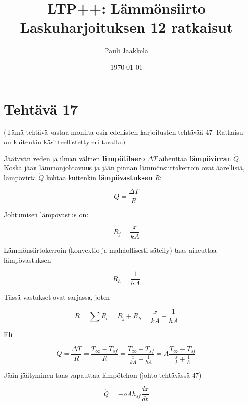\documentclass[12pt,a4paper,finnish]{article}
\title{LTP++: Lämmönsiirto\\Laskuharjoituksen 12 ratkaisut}
\date{\today}
\author{Pauli Jaakkola}
\begin{document}
\maketitle
\tableofcontents
\newpage

\section{Tehtävä 17}

(Tämä tehtävä vastaa monilta osin edellisten harjoitusten tehtävää 47. Ratkaisu on 
kuitenkin käsitteellistetty eri tavalla.)

Jäätyvän veden ja ilman välinen \textbf{lämpötilaero} $\Delta T$ aiheuttaa \textbf{lämpövirran} 
$\dot{Q}$. Koska jään lämmönjohtavuus ja jään pinnan lämmönsiirtokerroin ovat äärellisiä, 
lämpövirta $\dot{Q}$ kohtaa kuitenkin \textbf{lämpövastuksen} $R$:

\begin{equation}
 \dot{Q} = \frac{\Delta T}{R}
\end{equation}

Johtumisen lämpövastus on:

\begin{equation}
 R_j = \frac{x}{kA}
\end{equation}

Lämmönsiirtokerroin (konvektio ja mahdollisesti säteily) taas aiheuttaa lämpövastuksen

\begin{equation}
 R_h = \frac{1}{hA}
\end{equation}

Tässä vastukset ovat sarjassa, joten

\begin{equation}
 R = \sum R_i = R_j + R_h = \frac{x}{kA} + \frac{1}{hA}
\end{equation}

Eli

\begin{equation}
 \dot{Q} = \frac{\Delta T}{R} = \frac{T_{\infty} - T_{sf}}{R} = \frac{T_{\infty} 
  - T_{sf}}{\frac{x}{kA} + \frac{1}{hA}} = A\frac{T_{\infty} 
  - T_{sf}}{\frac{x}{k} + \frac{1}{h}}
\end{equation}

Jään jäätyminen taas vapauttaa lämpötehon (johto tehtävässä 47)

\begin{equation}
 \dot{Q} = -\rho Ah_{sf}\frac{dx}{dt}
\end{equation}
\end{document}
